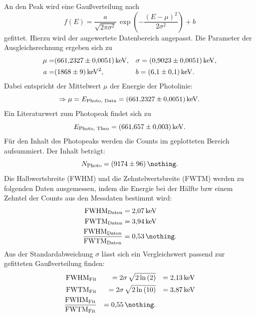 An den Peak wird eine Gaußverteilung nach
\begin{equation*}
	f(E) = \frac{a}{\sqrt{2 \pi \sigma^2}} \, \exp{\left( - \frac{(E-\mu)^2}{2 \sigma^2} \right)} + b
\end{equation*}
gefittet.
Hierzu wird der augewertete Datenbereich angepasst.
Die Parameter der Ausgleichsrechnung ergeben sich zu
\begin{align*}
	\mu = & \SI{661.2327 (51)}{\kilo \electronvolt}, && \sigma = \SI{0.9023 (51)}{\kilo \electronvolt}, \\
	 a = & \SI{1868 (9)}{\kilo \electronvolt^2}, 	 && b = \SI{6.1 (1)}{\kilo \electronvolt}. \\
\end{align*}
Dabei entspricht der Mittelwert $\mu$ der Energie der Photolinie:
\begin{equation*}
	\Rightarrow \mu = E_{\text{Photo, Data}} = \SI{661.2327 (51)}{\kilo \electronvolt}.
\end{equation*}
Ein Literaturwert \cite{nucleide} zum Photopeak findet sich zu
\begin{equation*}
	E_{\text{Photo, Theo}} = \SI{661.657 (3)}{\kilo \electronvolt}.
\end{equation*}
Für den Inhalt des Photopeaks werden die Counts im geplotteten Bereich aufsummiert.
Der Inhalt beträgt:
\begin{equation*}
	N_{\text{Photo}} = \SI{9174 (96)}{\nothing}.
\end{equation*}
Die Halbwertsbreite (FWHM) und die Zehntelwertsbreite (FWTM) werden zu folgenden Daten ausgemessen, indem die Energie bei der Hälfte bzw einem Zehntel der Counts aus den Messdaten bestimmt wird:
\begin{align*}
	\text{FWHM}_{\text{Daten}} & = \SI{2.07}{\kilo \electronvolt}\\
	\text{FWTM}_{\text{Daten}} & = \SI{3.94}{\kilo \electronvolt}\\
	\frac{ \text{FWHM}_{\text{Daten}} }{ \text{FWTM}_{\text{Daten}} } & = \SI{0.53}{\nothing}. \\
\end{align*}
Aus der Standardabweichung $\sigma$ lässt sich ein Vergleichswert passend zur gefitteten Gaußverteilung finden:
\begin{align*}
	\text{FWHM}_{\text{Fit}} && =  2 \sigma \, \sqrt{2 \ln{(2)}}   && = \SI{2.13}{\kilo \electronvolt}\\
	\text{FWTM}_{\text{Fit}} && =  2 \sigma \, \sqrt{2 \ln{(10)}}  && = \SI{3.87}{\kilo \electronvolt}\\
	\frac{ \text{FWHM}_{\text{Fit}} }{ \text{FWTM}_{\text{Fit}} } && = \SI{0.55}{\nothing}. \\
\end{align*}
\FloatBarrier

